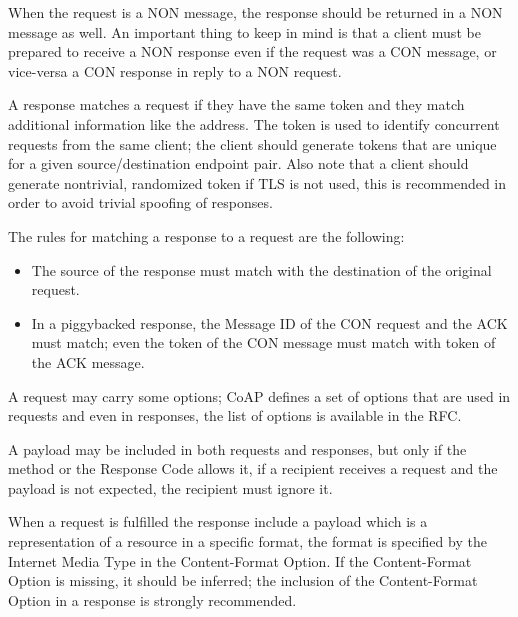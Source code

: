 	When the request is a NON message, the response should be returned in a NON message as well.\newline
	An important thing to keep in mind is that a client must be prepared to receive a NON response even if the request was a CON message, or vice-versa a CON response in reply to a NON request.\newline
	
	A response matches a request if they have the same token and they match additional information like the address.\newline
	The token is used to identify concurrent requests from the same client; the client should generate tokens that are unique for a given source/destination endpoint pair.\newline
	Also note that a client should generate nontrivial, randomized token if TLS is not used, this is recommended in order to avoid trivial spoofing of responses.\newline
	
	The rules for matching a response to a request are the following:
	\begin{itemize}
		\item The source of the response must match with the destination of the original request.
		\item In a piggybacked response, the Message ID of the CON request and the ACK must match; even the token of the CON message must match with token of the ACK message.
	\end{itemize}
	A request may carry some options; CoAP defines a set of options that are used in requests and even in responses,
	the list of options is available in the RFC.
	
	
	A payload may be included in both requests and responses, but only if the method or the Response Code allows it, if a recipient receives a request and the payload is not expected, the recipient must ignore it.
	
	When a request is fulfilled the response include a payload which is a representation of a resource in a specific format, the format is specified by the Internet Media Type in the Content-Format Option.\newline
	If the Content-Format Option is missing, it should be inferred; the inclusion of the Content-Format Option in a response is strongly recommended.\newline
	
